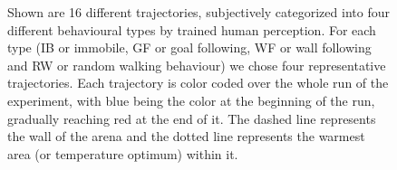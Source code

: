 \begin{figure}
    \centering
    \caption{Shown are 16 different trajectories, subjectively categorized into four different behavioural types by trained human perception. For each type (IB or immobile, GF or goal following, WF or wall following and RW or random walking behaviour) we chose four representative trajectories. Each trajectory is color coded over the whole run of the experiment, with blue being the color at the beginning of the run, gradually reaching red at the end of it. The dashed line represents the wall of the arena and the dotted line represents the warmest area (or temperature optimum) within it.}
    \label{fig:Well_Beehaved}
\end{figure}



